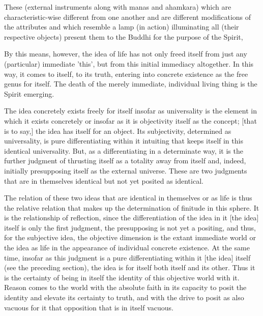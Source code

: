 These (external instruments along with manas and ahamkara)
which are characteristic-wise different from one another
and are different modifications of the attributes
and which resemble a lamp (in action) illuminating all (their respective objects)
present them to the Buddhi for the purpose of the Spirit,

By this means, however, the idea of life has not only freed itself from just
any (particular) immediate 'this', but from this initial immediacy altogether.
In this way, it comes to itself, to its truth,
entering into concrete existence as the free genus for itself.
The death of the merely immediate, individual living thing is the Spirit emerging.

The idea concretely exists freely for itself insofar as universality is the element
in which it exists concretely or insofar as it is objectivity itself as the concept;
[that is to say,] the idea has itself for an object.
Its subjectivity, determined as universality, is pure differentiating within it
intuiting that keeps itself in this identical universality.
But, as a differentiating in a determinate way, it is the further judgment of
thrusting itself as a totality away from itself and, indeed,
initially presupposing itself as the external universe.
These are two judgments that are in themselves identical but
not yet posited as identical.

The relation of these two ideas that are identical in themselves or as life is thus
the relative relation that makes up the determination of finitude in this sphere.
It is the relationship of reflection, since the differentiation of
the idea in it [the idea] itself is only the first judgment,
the presupposing is not yet a positing, and thus,
for the subjective idea, the objective dimension is the extant immediate world or
the idea as life in the appearance of individual concrete existence.
At the same time, insofar as this judgment is a pure differentiating
within it [the idea] itself (see the preceding section),
the idea is for itself both itself and its other.
Thus it is the certainty of being in itself
the identity of this objective world with it.
Reason comes to the world with the absolute faith
in its capacity to posit the identity and
elevate its certainty to truth, and
with the drive to posit as also vacuous for it
that opposition that is in itself vacuous.

